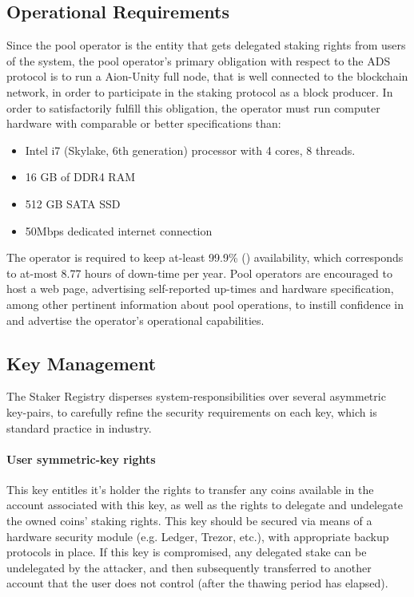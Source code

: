 \subsection{Operational Requirements} \label{operator_requirements}
Since the pool operator is the entity that gets delegated staking rights from users of the system, the pool operator's primary obligation with respect to the ADS protocol is to run a Aion-Unity full node, that is well connected to the blockchain network, in order to participate in the staking protocol as a block producer. In order to satisfactorily fulfill this obligation, the operator must run computer hardware with comparable or better specifications than:
\begin{itemize}
    \item Intel i7 (Skylake, 6th generation) processor with 4 cores, 8 threads.
    \item 16 GB of DDR4 RAM 
    \item 512 GB SATA SSD
    \item 50Mbps dedicated internet connection  
\end{itemize}
The operator is required to keep at-least 99.9\% () availability, which corresponds to at-most 8.77 hours of down-time per year. Pool operators are encouraged to host a web page, advertising self-reported up-times and hardware specification, among other pertinent information about pool operations, to instill confidence in and advertise the operator's operational capabilities. 

\subsection{Key Management} \label{key_management}
The Staker Registry disperses system-responsibilities over several asymmetric key-pairs, to carefully refine the security requirements on each key, which is standard practice in industry.

\paragraph{User symmetric-key rights} This key entitles it's holder the rights to transfer any coins available in the account associated with this key, as well as the rights to delegate and undelegate the owned coins' staking rights. This key should be secured via means of a hardware security module (e.g. Ledger, Trezor, etc.), with appropriate backup protocols in place. If this key is compromised, any delegated stake can be undelegated by the attacker, and then subsequently transferred to another account that the user does not control (after the thawing period has elapsed). 

